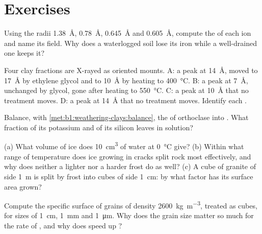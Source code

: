 \section{Exercises}

\begin{exercise}[$\star$]\label{exo:b1:weathering-clays:1}
Using the radii  \qty{1.38}{\angstrom},  \qty{0.78}{\angstrom},
 \qty{0.645}{\angstrom} and  \qty{0.605}{\angstrom}, compute
the  of each ion and name its field. Why does a waterlogged soil
lose its iron while a well-drained one keeps it?
\end{exercise}

\begin{exercise}[$\star$]\label{exo:b1:weathering-clays:2}
Four clay fractions are X-rayed as oriented mounts. A: a peak at
\SI{14}{\angstrom}, moved to \SI{17}{\angstrom} by ethylene glycol and to
\SI{10}{\angstrom} by heating to \SI{400}{\celsius}. B: a peak at
\SI{7}{\angstrom}, unchanged by glycol, gone after heating to
\SI{550}{\celsius}. C: a peak at \SI{10}{\angstrom} that no treatment moves. D:
a peak at \SI{14}{\angstrom} that no treatment moves. Identify each .
\end{exercise}

\begin{exercise}[$\star$]\label{exo:b1:weathering-clays:3}
Balance, with \cref{met:b1:weathering-clays:balance}, the  of
orthoclase  into . What fraction of its potassium and of
its silicon leaves in solution?
\end{exercise}

\begin{exercise}[$\star$]\label{exo:b1:weathering-clays:4}
(a) What volume of ice does \qty{10}{cm^3} of water at \qty{0}{\celsius} give?
(b) Within what range of temperature does ice growing in cracks split rock
most effectively, and why does neither a lighter nor a harder frost do as well?
(c) A cube of granite of side \qty{1}{m} is split by frost into cubes of side
\qty{1}{cm}: by what factor has its surface area grown?
\end{exercise}

\begin{exercise}[$\star\star$]\label{exo:b1:weathering-clays:5}
Compute the specific surface of  grains of density
\qty{2600}{kg.m^{-3}}, treated as cubes, for sizes of \qty{1}{cm}, \qty{1}{mm}
and \qty{1}{\micro m}. Why does the grain size matter so much for the rate of
, and why does  speed up ?
\end{exercise}

